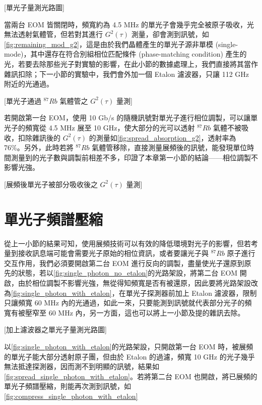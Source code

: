 \documentclass[class=NCU_thesis, crop=false]{standalone}
\begin{document}
[單光子量測光路圖]

當兩台 EOM 皆關閉時，頻寬約為 4.5 MHz 的單光子會幾乎完全被原子吸收，光無法透射氣體管，但若對其進行 $G^{2}(\tau)$ 測量，卻會測到訊號，如\cref{fig:remaining_mod_g2}，這是由於我們晶體產生的單光子源非單模 (single-mode)，其中還存在符合別組相位匹配條件 (phase-matching condition) 產生的光，若要去除那些光子對實驗的影響，在此小節的數據處理上，我們直接將其當作雜訊扣除；下一小節的實驗中，我們會外加一個 Etalon 濾波器，只讓 112 GHz 附近的光通過。

[單光子通過 $^{87}Rb$ 氣體管之 $G^{2}(\tau)$ 量測]

若開啟第一台 EOM，使用 10 Gb/s 的隨機訊號對單光子進行相位調製，可以讓單光子的頻寬從 4.5 MHz 展至 10 GHz，使大部分的光可以透射 $^{87}Rb$ 氣體不被吸收，扣除雜訊後的 $G^2(\tau)$ 的測量如\cref{fig:spread_absorption_g2}，透射率為 76\%。另外，此時若將 $^{87}Rb$ 氣體管移除，直接測量展頻後的訊號，能發現單位時間測量到的光子數與調製前相差不多，印證了本章第一小節的結論——相位調製不影響光強。

[展頻後單光子被部分吸收後之 $G^{2}(\tau)$ 量測]

\section{單光子頻譜壓縮}

從上一小節的結果可知，使用展頻技術可以有效的降低環境對光子的影響，但若考量到接收訊息端可能會需要光子原始的相位資訊，或者要讓光子與 $^{87}Rb$ 原子進行交互作用，我們必須要開啟第二台 EOM 進行反向的調製，盡量使光子還原到原先的狀態，若以\cref{fig:single_photon_no_etalon}的光路架設，將第二台 EOM 開啟，由於相位調製不影響光強，無從得知頻寬是否有被還原，因此要將光路架設改為\cref{fig:single_photon_with_etalon}，在單光子探測器前加上 Etalon 濾波器，限制只讓頻寬 60 MHz 內的光通過，如此一來，只要能測到訊號就代表部分光子的頻寬有被壓窄至 60 MHz 內，另一方面，這也可以將上一小節及提的雜訊去除。

[加上濾波器之單光子量測光路圖]

以\cref{fig:single_photon_with_etalon}的光路架設，只開啟第一台 EOM 時，被展頻的單光子能大部分透射原子團，但由於 Etalon 的過濾，頻寬 10 GHz 的光子幾乎無法抵達探測器，因而測不到明顯的訊號，結果如\cref{fig:spread_single_photon_with_etalon}。若將第二台 EOM 也開啟，將已展頻的單光子頻譜壓縮，則能再次測到訊號，如\cref{fig:compress_single_photon_with_etalon}
\end{document}
